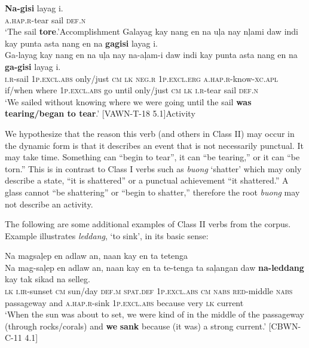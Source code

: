 \gll \textbf{Na-gisi}  layag  i. \\
\textsc{a.hap.r}-tear  sail  \textsc{def.n} \\
\glt ‘The sail \textbf{tore}.’\hspace{1cm}Accomplishment
\z
\ea
\label{bkm:Ref398301061}
Galayag  kay  nang  en  na  uļa  nay  nļami   daw  indi  kay  punta  asta  nang  en  na  \textbf{gagisi}  layag  i. \\\smallskip
\gll Ga-layag  kay  nang  en  na  uļa  nay  na-aļam-i   daw  indi  kay  punta  asta  nang  en  na  \textbf{ga-gisi}  layag  i.\\
\textsc{i.r}-sail  1\textsc{p.excl.abs}  only/just  \textsc{cm}  \textsc{lk}  \textsc{neg.r}  1\textsc{p.excl.erg}  \textsc{a.hap.r}-know-\textsc{xc.apl} if/when  where  1\textsc{p.excl.abs}  go  until  only/just  \textsc{cm}  \textsc{lk}   \textsc{i.r}-tear  sail  \textsc{def.n} \\
\glt ‘We sailed without knowing where we were going until the sail \textbf{was tearing/began to tear}.’ [VAWN-T-18 5.1]\hspace{1cm}Activity
\z

We hypothesize that the reason this verb (and others in Class II) may occur in the dynamic form is that it describes an event that is not necessarily punctual. It may take time. Something can “begin to tear”, it can “be tearing,” or it can “be torn.” This is in contrast to Class I verbs such as \textit{buong} ‘shatter’ which may only describe a state, “it is shattered” or a punctual achievement “it shattered.” A glass cannot “be shattering” or “begin to shatter,” therefore the root \textit{buong} may not describe an activity.

The following are some additional examples of Class II verbs from the corpus. Example  illustrates \textit{leddang}, ‘to sink’, in its basic sense:

\ea
\label{bkm:Ref388967079}
Na magsaļep  en  adlaw  an,  naan  kay  en  ta  tetenga \\\smallskip
\gll Na\footnotemark{}  mag-saļep  en  adlaw  an,  naan  kay  en  ta  te-tenga ta  saļangan  daw  \textbf{na-leddang}  kay  tak  sikad  na  selleg. \\
\textsc{lk}  \textsc{i.ir}-sunset  \textsc{cm}  sun/day  \textsc{def.m}  \textsc{spat.def}  1\textsc{p.excl.abs}  \textsc{cm}  \textsc{nabs}  \textsc{red}-middle \textsc{nabs}  passageway  and  \textsc{a.hap.r}-sink  1\textsc{p.excl.abs}  because  very  \textsc{lk}  current \\
\glt ‘When the sun was about to set, we were kind of in the middle of the passageway (through rocks/corals) and \textbf{we} \textbf{sank} because (it was) a strong current.’ [CBWN-C-11 4.1]
\z

